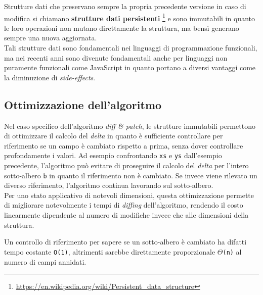 Strutture dati che preservano sempre la propria precedente versione in caso di modifica si chiamano \textbf{strutture dati persistenti} \footnote{\url{https://en.wikipedia.org/wiki/Persistent_data_structure}} e sono immutabili in quanto le loro operazioni non mutano direttamente la struttura, ma bensì generano sempre una nuova aggiornata. \\

Tali strutture dati sono fondamentali nei linguaggi di programmazione funzionali, ma nei recenti anni sono divenute fondamentali anche per linguaggi non puramente funzionali come JavaScript in quanto portano a diversi vantaggi come la diminuzione di \textit{side-effects}.

\subsection{Ottimizzazione dell'algoritmo}

Nel caso specifico dell'algoritmo \textit{diff \& patch}, le strutture immutabili permettono di ottimizzare il calcolo del \textit{delta} in quanto è sufficiente controllare per riferimento se un campo è cambiato rispetto a prima, senza dover controllare profondamente i valori. Ad esempio confrontando \texttt{xs} e \texttt{ys} dall'esempio precedente, l'algoritmo può evitare di proseguire il calcolo del \textit{delta} per l'intero sotto-albero \texttt{b} in quanto il riferimento non è cambiato. Se invece viene rilevato un diverso riferimento, l'algoritmo continua lavorando sul sotto-albero. \\

Per uno stato applicativo di notevoli dimensioni, questa ottimizzazione permette di migliorare notevolmente i tempi di \textit{diffing} dell'algoritmo, rendendo il costo linearmente dipendente al numero di modifiche invece che alle dimensioni della struttura.

Un controllo di riferimento per sapere se un sotto-albero è cambiato ha difatti tempo costante \texttt{O(1)}, altrimenti sarebbe direttamente proporzionale \texttt{$\Theta$(n)} al numero di campi annidati.
